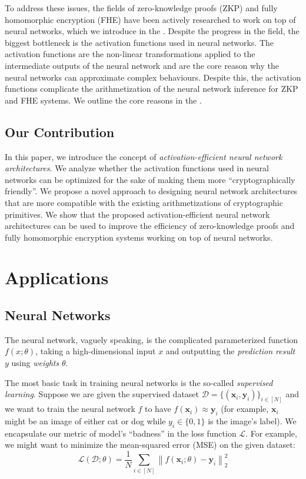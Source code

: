 \documentclass{iacrtrans}
\begin{document}
To address these issues, the fields of zero-knowledge proofs (ZKP) and fully
homomorphic encryption (FHE) have been actively researched to work on top of
neural networks, which we introduce in the . Despite
the progress in the field, the biggest bottleneck is the activation functions
used in neural networks. The activation functions are the non-linear
transformations applied to the intermediate outputs of the neural network and
are the core reason why the neural networks can approximate complex behaviours.
Despite this, the activation functions complicate the arithmetization of the
neural network inference for ZKP and FHE systems. We outline the core reasons 
in the .

\subsection{Our Contribution}\label{section:our_contribution}

In this paper, we introduce the concept of \textit{activation-efficient neural
network architectures}. We analyze whether the activation functions used in
neural networks can be optimized for the sake of making them more
``cryptographically friendly''. We propose a novel approach to designing neural
network architectures that are more compatible with the existing
arithmetizations of cryptographic primitives. We show that the proposed
activation-efficient neural network architectures can be used to improve the
efficiency of zero-knowledge proofs and fully homomorphic encryption systems
working on top of neural networks.

\section{Applications}\label{section:preliminaries}

\subsection{Neural Networks}

The neural network, vaguely speaking, is the complicated parameterized function 
$f(x;\theta)$, taking a high-dimensional input $x$
and outputting the \textit{prediction result} $y$ using \textit{weights} $\theta$. 

The most basic task in training neural networks is the so-called
\textit{supervised learning}. Suppose we are given the supervised dataset
$\mathcal{D} = \{(\mathbf{x}_i, \mathbf{y}_i)\}_{i \in [N]}$ and we want to
train the neural network $f$ to have $f(\mathbf{x}_i) \approx \mathbf{y}_i$ (for
example, $\mathbf{x}_i$ might be an image of either cat or dog while $y_i \in
\{0,1\}$ is the image's label). We encapsulate our metric of model's ``badness''
in the loss function $\mathcal{L}$. For example, we might want to minimize the 
mean-squared error (MSE) on the given dataset:
\begin{equation*}
    \mathcal{L}(\mathcal{D};\theta) = \frac{1}{N} \sum_{i \in [N]} \left\|f(\mathbf{x}_i;\theta) - \mathbf{y}_i\right\|_2^2
\end{equation*}
\end{document}
